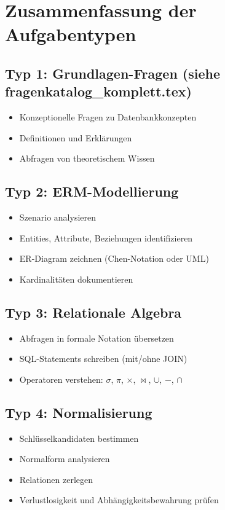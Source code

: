 \documentclass[a4paper]{article}
\begin{document}
\newpage

\section{Zusammenfassung der Aufgabentypen}

\subsection{Typ 1: Grundlagen-Fragen (siehe fragenkatalog\_komplett.tex)}

\begin{itemize}
    \item Konzeptionelle Fragen zu Datenbankkonzepten
    \item Definitionen und Erklärungen
    \item Abfragen von theoretischem Wissen
\end{itemize}

\subsection{Typ 2: ERM-Modellierung}

\begin{itemize}
    \item Szenario analysieren
    \item Entities, Attribute, Beziehungen identifizieren
    \item ER-Diagram zeichnen (Chen-Notation oder UML)
    \item Kardinalitäten dokumentieren
\end{itemize}

\subsection{Typ 3: Relationale Algebra}

\begin{itemize}
    \item Abfragen in formale Notation übersetzen
    \item SQL-Statements schreiben (mit/ohne JOIN)
    \item Operatoren verstehen: $\sigma$, $\pi$, $\times$, $\bowtie$, $\cup$, $-$, $\cap$
\end{itemize}

\subsection{Typ 4: Normalisierung}

\begin{itemize}
    \item Schlüsselkandidaten bestimmen
    \item Normalform analysieren
    \item Relationen zerlegen
    \item Verlustlosigkeit und Abhängigkeitsbewahrung prüfen
\end{itemize}
\end{document}
